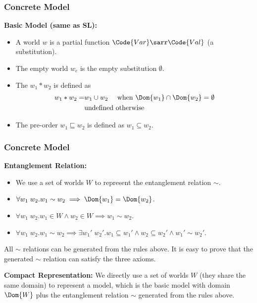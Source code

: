 \begin{frame}[fragile]
    \frametitle{Concrete Model}

\textbf{Basic Model (same as SL):} 
\begin{itemize}
    \item A world $w$ is a partial function $\Code{Var}\sarr\Code{Val}$ (a substitution).
    \item The empty world $w_e$ is the empty substitution $\emptyset$.
    \item The $w_1 * w_2$ is defined as
    \begin{align*}
        w_1 * w_2 =& w_1 \cup w_2 \quad \text{ when } \Dom{w_1} \cap \Dom{w_2} = \emptyset
        \\& \text{undefined otherwise}
    \end{align*}\noindent
    \item The pre-order $w_1 \sqsubseteq w_2$ is defined as $w_1 \subseteq w_2$.
\end{itemize}
\end{frame}

\begin{frame}[fragile]
    \frametitle{Concrete Model}

\textbf{Entanglement Relation:} 
\begin{itemize}
    \item We use a set of worlds $W$ to represent the entanglement relation $\sim$.
    \item $\forall w_1\; w_2. w_1 \sim w_2 \implies \Dom{w_1} = \Dom{w_2}$.
    \item $\forall w_1\; w_2. w_1 \in W \land w_2 \in W \implies w_1 \sim w_2$.
    \item $\forall w_1\; w_2. w_1 \sim w_2 \implies \exists w_1'\;w_2'. w_1 \subseteq w_1' \land w_2 \subseteq w_2' \land w_1' \sim w_2'$.
\end{itemize}
All $\sim$ relations can be generated from the rules above. It is easy to prove that the generated $\sim$ relation can satisfy the three axioms.

\textbf{Compact Representation:} We directly use a set of worlds $W$ (they share the same domain) to represent a model, which is the basic model with domain $\Dom{W}$ plus the entanglement relation $\sim$ generated from the rules above.
\end{frame}

